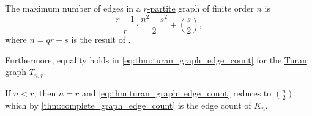 \begin{proposition}\label{thm:turan_graph_edge_count}
  The maximum number of edges in a \hyperref[def:multipartite_graph]{\( r \)-partite} graph of finite order \( n \) is
  \begin{equation}\label{eq:thm:turan_graph_edge_count}
    \frac {r - 1} r \cdot \frac {n^2 - s^2} 2 + \binom s 2,
  \end{equation}
  where \( n = qr + s \) is the result of .

  Furthermore, equality holds in \eqref{eq:thm:turan_graph_edge_count} for the \hyperref[def:turan_graph]{Turan graph} \( T_{n,r} \).
\end{proposition}
\begin{comments}
  \item If \( n < r \), then \( n = r \) and \eqref{eq:thm:turan_graph_edge_count} reduces to \( \binom n 2 \), which by \cref{thm:complete_graph_edge_count} is the edge count of \( K_n \).
\end{comments}
